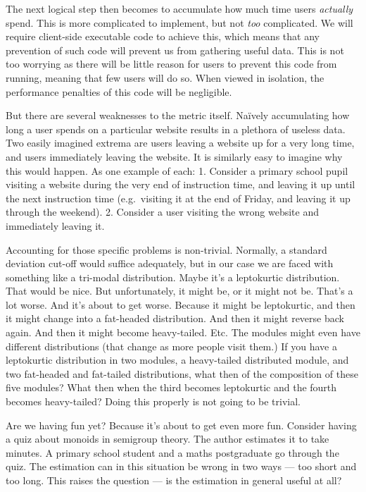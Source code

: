 \documentclass{article}
\begin{document}
\begin{multicols}{2}
The next logical step then becomes to accumulate how much time users 
\emph{actually} spend. This is more complicated to implement, but not 
\emph{too} complicated. We will require client-side executable code to achieve 
this, which means that any prevention of such code will prevent us from 
gathering useful data. This is not too worrying as there will be little reason 
for users to prevent this code from running, meaning that few users will do 
so. When viewed in isolation, the performance penalties of this code will be 
negligible.

But there are several weaknesses to the metric itself. Naïvely accumulating 
how long a user spends on a particular website results in a plethora of 
useless data. Two easily imagined extrema are users leaving a website up for a 
very long time, and users immediately leaving the website. It is similarly 
easy to imagine why this would happen. As one example of each: 1. Consider a 
primary school pupil visiting a website during the very end of instruction 
time, and leaving it up until the next instruction time (e.g.\ visiting it at 
the end of Friday, and leaving it up through the weekend). 2. Consider a user 
visiting the wrong website and immediately leaving it.

Accounting for those specific problems is non-trivial. Normally, a standard 
deviation cut-off would suffice adequately, but in our case we are faced with 
something like a tri-modal distribution. Maybe it's a leptokurtic 
distribution. That would be nice. But unfortunately, it might be, or it might 
not be. That's a lot worse. And it's about to get worse. Because it might be 
leptokurtic, and then it might change into a fat-headed distribution. And then 
it might reverse back again. And then it might become heavy-tailed. Etc. The 
modules might even have different distributions (that change as more people 
visit them.) If you have a leptokurtic distribution in two modules, a 
heavy-tailed distributed module, and two fat-headed and fat-tailed 
distributions, what then of the composition of these five modules? What then 
when the third becomes leptokurtic and the fourth becomes heavy-tailed? Doing 
this properly is not going to be trivial.

Are we having fun yet? Because it's about to get even more fun. Consider 
having a quiz about monoids in semigroup theory. The author estimates it to 
take  minutes. A primary school student and a maths postgraduate go through 
the quiz. The estimation can in this situation be wrong in two ways --- too 
short and too long. This raises the question --- is the estimation in general 
useful at all?


\end{multicols}
\end{document}
